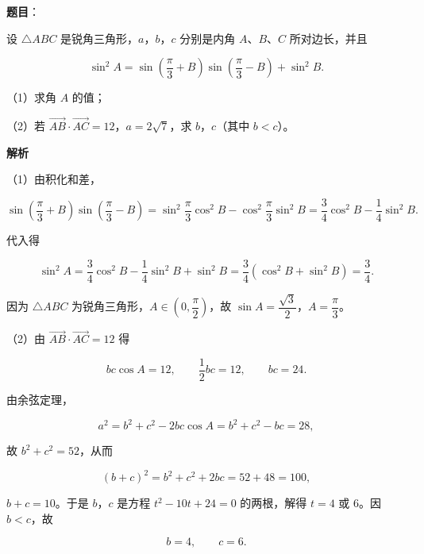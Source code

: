 \begin{answer}

\textbf{题目}：

设 $\triangle ABC$ 是锐角三角形，$a$，$b$，$c$ 分别是内角 $A$、$B$、$C$ 所对边长，并且

\nopagebreak[4]
\[\sin^2A=\sin\left(\frac\pi3+B\right)\sin\left(\frac\pi3-B\right)+\sin^2B.\]

（1）求角 $A$ 的值；

（2）若 $\overrightarrow{AB}\cdot\overrightarrow{AC}=12$，$a=2\sqrt7$，求 $b$，$c$（其中 $b<c$）。

\textbf{解析}

（1）由积化和差，

\nopagebreak[4]
\[\sin\left(\frac\pi3+B\right)\sin\left(\frac\pi3-B\right)
=\sin^2\frac\pi3\cos^2B-\cos^2\frac\pi3\sin^2B
=\frac34\cos^2B-\frac14\sin^2B.\]

代入得

\nopagebreak[4]
\[\sin^2A=\frac34\cos^2B-\frac14\sin^2B+\sin^2B
=\frac34(\cos^2B+\sin^2B)=\frac34.\]

因为 $\triangle ABC$ 为锐角三角形，$A\in\left(0,\dfrac\pi2\right)$，故 $\sin A=\dfrac{\sqrt3}2$，$A=\dfrac\pi3$。

（2）由 $\overrightarrow{AB}\cdot\overrightarrow{AC}=12$ 得

\nopagebreak[4]
\[bc\cos A=12,\qquad \frac12bc=12,\qquad bc=24.\]

由余弦定理，

\nopagebreak[4]
\[a^2=b^2+c^2-2bc\cos A=b^2+c^2-bc=28,\]

故 $b^2+c^2=52$，从而

\nopagebreak[4]
\[(b+c)^2=b^2+c^2+2bc=52+48=100,\]

$b+c=10$。于是 $b$，$c$ 是方程 $t^2-10t+24=0$ 的两根，解得 $t=4$ 或 $6$。因 $b<c$，故

\nopagebreak[4]
\[b=4,\qquad c=6.\]


\end{answer}
